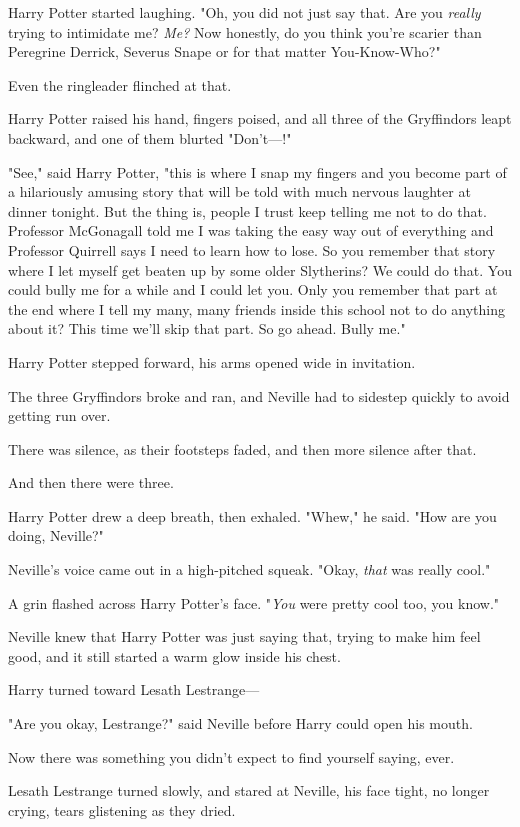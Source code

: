 Harry Potter started laughing. "Oh, you did not just say that. Are you
\emph{really} trying to intimidate me? \emph{Me?} Now honestly, do you think
you're scarier than Peregrine Derrick, Severus Snape or for that matter
You-Know-Who?"

Even the ringleader flinched at that.

Harry Potter raised his hand, fingers poised, and all three of the Gryffindors
leapt backward, and one of them blurted "Don't---!"

"See," said Harry Potter, "this is where I snap my fingers and you become part
of a hilariously amusing story that will be told with much nervous laughter at
dinner tonight. But the thing is, people I trust keep telling me not to do
that. Professor McGonagall told me I was taking the easy way out of everything
and Professor Quirrell says I need to learn how to lose. So you remember that
story where I let myself get beaten up by some older Slytherins? We could do
that. You could bully me for a while and I could let you. Only you remember
that part at the end where I tell my many, many friends inside this school not
to do anything about it? This time we'll skip that part. So go ahead. Bully me."

Harry Potter stepped forward, his arms opened wide in invitation.

The three Gryffindors broke and ran, and Neville had to sidestep quickly to
avoid getting run over.

There was silence, as their footsteps faded, and then more silence after that.

And then there were three.

Harry Potter drew a deep breath, then exhaled. "Whew," he said. "How are you
doing, Neville?"

Neville's voice came out in a high-pitched squeak. "Okay, \emph{that} was
really cool."

A grin flashed across Harry Potter's face. "\emph{You} were pretty cool too,
you know."

Neville knew that Harry Potter was just saying that, trying to make him feel
good, and it still started a warm glow inside his chest.

Harry turned toward Lesath Lestrange\mbox{---}

"Are you okay, Lestrange?" said Neville before Harry could open his mouth.

Now there was something you didn't expect to find yourself saying, ever.

Lesath Lestrange turned slowly, and stared at Neville, his face tight, no
longer crying, tears glistening as they dried.

